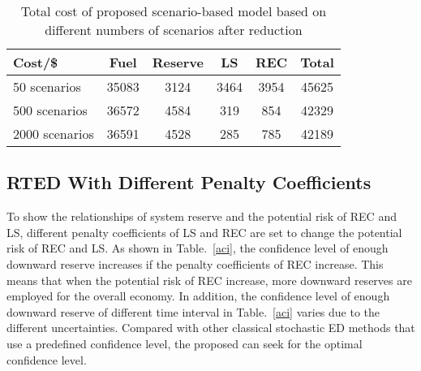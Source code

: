 

\begin{table}[h]
	\caption{{Total cost of proposed scenario-based model based on different numbers of scenarios after reduction}}
	\label{cost2}
	\begin{center}
		\begin{tabular}{|p{2.5cm}<{\centering}|c|c|c|c|c|}
			\hline
			{Cost/\$} & Fuel & Reserve & LS & REC & Total\\ \hline
			50 scenarios& 35083 & 3124& 3464& 3954& 45625\\\hline
			500 scenarios& 36572  & 4584& 319& 854& 42329\\\hline
			2000 scenarios& 36591 &4528&285&785& 42189\\\hline
		\end{tabular}
	\end{center}
\end{table}





\vspace{-1em}

\subsection {RTED With Different Penalty Coefficients}

To show the relationships of system reserve and the potential risk of REC and LS, different penalty coefficients of LS and REC are set to change the potential risk of REC and LS. As shown in Table.~\ref{aci}, the confidence level of enough downward reserve increases if the penalty coefficients of REC increase. This means that when the potential risk of REC increase, more downward reserves are employed for the overall economy. In addition, the confidence level of enough downward reserve of different time interval in Table.~\ref{aci} varies due to the different uncertainties. Compared with other classical stochastic ED methods that use a predefined confidence level, the proposed can seek for the optimal confidence level.

